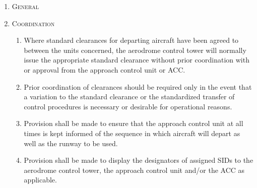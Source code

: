 \documentclass[../main.tex]{subfiles}
\begin{document}
    \begin{enumerate}[itemsep=0.2cm]\centering
        \item \textsc{General}

        \item \textsc{Coordination}
        \begin{enumerate}
            \item Where standard clearances for departing aircraft have been agreed to between the units concerned, the aerodrome control tower will normally issue the appropriate standard clearance without prior coordination with or approval from the approach control unit or ACC.
            \item Prior coordination of clearances should be required only in the event that a variation to the standard clearance or the standardized transfer of control procedures is necessary or desirable for operational reasons.
            \item Provision shall be made to ensure that the approach control unit at all times is kept informed of the sequence in which aircraft will depart as well as the runway to be used.
            \item Provision shall be made to display the designators of assigned SIDs to the aerodrome control tower, the approach control unit and/or the ACC as applicable.
        \end{enumerate}


\end{enumerate}
\end{document}
